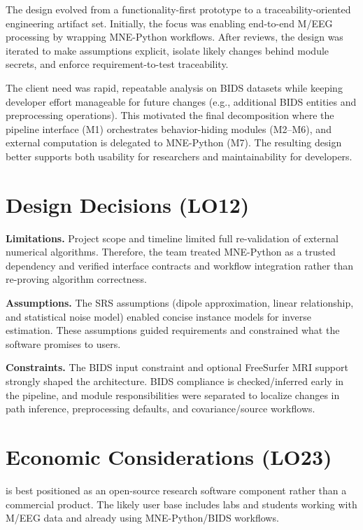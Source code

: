 \documentclass{article}
\begin{document}
The design evolved from a functionality-first prototype to a traceability-oriented
engineering artifact set. Initially, the focus was enabling end-to-end M/EEG
processing by wrapping MNE-Python workflows. After reviews, the design was iterated
to make assumptions explicit, isolate likely changes behind module secrets, and
enforce requirement-to-test traceability.

The client need was rapid, repeatable analysis on BIDS datasets while keeping
developer effort manageable for future changes (e.g., additional BIDS entities and
preprocessing operations). This motivated the final decomposition where the pipeline
interface (M1) orchestrates behavior-hiding modules (M2--M6), and external
computation is delegated to MNE-Python (M7). The resulting design better supports
both usability for researchers and maintainability for developers.

\section{Design Decisions (LO12)}

\textbf{Limitations.}
Project scope and timeline limited full re-validation of external numerical
algorithms. Therefore, the team treated MNE-Python as a trusted dependency and
verified interface contracts and workflow integration rather than re-proving
algorithm correctness.

\textbf{Assumptions.}
The SRS assumptions (dipole approximation, linear relationship, and statistical noise
model) enabled concise instance models for inverse estimation. These assumptions
guided requirements and constrained what the software promises to users.

\textbf{Constraints.}
The BIDS input constraint and optional FreeSurfer MRI support strongly shaped the
architecture. BIDS compliance is checked/inferred early in the pipeline, and
module responsibilities were separated to localize changes in path inference,
preprocessing defaults, and covariance/source workflows.

\section{Economic Considerations (LO23)}

\progname{} is best positioned as an open-source research software component rather
than a commercial product. The likely user base includes labs and students working
with M/EEG data and already using MNE-Python/BIDS workflows.
\end{document}
